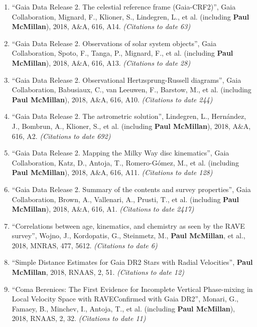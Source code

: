 \documentclass{resume}
\begin{document}
\begin{enumerate}
\item ``Gaia Data Release 2. The celestial reference frame (Gaia-CRF2)'', Gaia Collaboration, Mignard, F., Klioner, S., Lindegren, L., et al. (including \textbf{Paul McMillan}), 2018, A\&A, 616, A14. \textit{(Citations to date 63)}

\item ``Gaia Data Release 2. Observations of solar system objects'', Gaia Collaboration, Spoto, F., Tanga, P., Mignard, F., et al. (including \textbf{Paul McMillan}), 2018, A\&A, 616, A13. \textit{(Citations to date 28)}

\item ``Gaia Data Release 2. Observational Hertzsprung-Russell diagrams'', Gaia Collaboration, Babusiaux, C., van Leeuwen, F., Barstow, M., et al. (including \textbf{Paul McMillan}), 2018, A\&A, 616, A10. \textit{(Citations to date 244)}

\item ``Gaia Data Release 2. The astrometric solution'', Lindegren, L., Hern\'andez, J., Bombrun, A., Klioner, S., et al. (including \textbf{Paul McMillan}), 2018, A\&A, 616, A2. \textit{(Citations to date 692)}

\item ``Gaia Data Release 2. Mapping the Milky Way disc kinematics'', Gaia Collaboration, Katz, D., Antoja, T., Romero-G\'omez, M., et al. (including \textbf{Paul McMillan}), 2018, A\&A, 616, A11. \textit{(Citations to date 128)}

\item ``Gaia Data Release 2. Summary of the contents and survey properties'', Gaia Collaboration, Brown, A., Vallenari, A., Prusti, T., et al. (including \textbf{Paul McMillan}), 2018, A\&A, 616, A1. \textit{(Citations to date 2417)}

\item ``Correlations between age, kinematics, and chemistry as seen by the RAVE survey'', Wojno, J., Kordopatis, G., Steinmetz, M., \textbf{Paul McMillan}, et al., 2018, MNRAS, 477, 5612. \textit{(Citations to date 6)}

\item ``Simple Distance Estimates for Gaia DR2 Stars with Radial Velocities'', \textbf{Paul McMillan}, 2018, RNAAS, 2, 51. \textit{(Citations to date 12)}

\item ``Coma Berenices: The First Evidence for Incomplete Vertical Phase-mixing in Local Velocity Space with RAVE{\textemdash}Confirmed with Gaia DR2'', Monari, G., Famaey, B., Minchev, I., Antoja, T., et al. (including \textbf{Paul McMillan}), 2018, RNAAS, 2, 32. \textit{(Citations to date 11)}


\end{enumerate}
\end{document}
